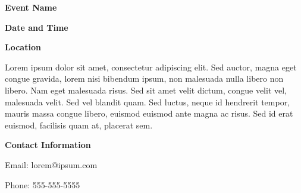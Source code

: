 \documentclass[11pt]{article}
\begin{document}
\begin{center}


\vspace{1cm}

{\Large\textbf{Event Name}}

\vspace{0.5cm}

{\large\textbf{Date and Time}}

\vspace{0.5cm}

{\large\textbf{Location}}

\vspace{1cm}

Lorem ipsum dolor sit amet, consectetur adipiscing elit. Sed auctor, magna eget congue gravida, lorem nisi bibendum ipsum, non malesuada nulla libero non libero. Nam eget malesuada risus. Sed sit amet velit dictum, congue velit vel, malesuada velit. Sed vel blandit quam. Sed luctus, neque id hendrerit tempor, mauris massa congue libero, euismod euismod ante magna ac risus. Sed id erat euismod, facilisis quam at, placerat sem.

\vspace{1cm}

{\large\textbf{Contact Information}}

\vspace{0.5cm}

Email: lorem@ipsum.com

Phone: 555-555-5555

\end{center}
\end{document}

